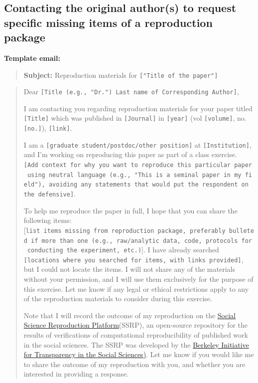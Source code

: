 \documentclass[
]{book}
\begin{document}
\hypertarget{contacting-the-original-authors-to-request-specific-missing-items-of-a-reproduction-package}{%
\subsection{Contacting the original author(s) to request specific missing items of a reproduction package}\label{contacting-the-original-authors-to-request-specific-missing-items-of-a-reproduction-package}}

\textbf{Template email:}

\begin{quote}
\textbf{Subject:} Reproduction materials for \texttt{{[}"Title\ of\ the\ paper"{]}}
\end{quote}

\begin{quote}
Dear \texttt{{[}Title\ (e.g.,\ "Dr.")\ Last\ name\ of\ Corresponding\ Author{]}},

I am contacting you regarding reproduction materials for your paper titled \texttt{{[}Title{]}} which was published in \texttt{{[}Journal{]}} in \texttt{{[}year{]}} (vol \texttt{{[}volume{]}}, no. \texttt{{[}no.{]}}), \texttt{{[}link{]}}.

I am a \texttt{{[}graduate\ student/postdoc/other\ position{]}} at \texttt{{[}Institution{]}}, and I'm working on reproducing this paper as part of a class exercise. \texttt{{[}Add\ context\ for\ why\ you\ want\ to\ reproduce\ this\ particular\ paper\ using\ neutral\ language\ (e.g.,\ "This\ is\ a\ seminal\ paper\ in\ my\ field"),\ avoiding\ any\ statements\ that\ would\ put\ the\ respondent\ on\ the\ defensive{]}}.

To help me reproduce the paper in full, I hope that you can share the following items: {[}\texttt{list\ items\ missing\ from\ reproduction\ package,\ preferably\ bulleted\ if\ more\ than\ one\ (e.g.,\ raw/analytic\ data,\ code,\ protocols\ for\ conducting\ the\ experiment,\ etc.)}{]}. I have already searched \texttt{{[}locations\ where\ you\ searched\ for\ items,\ with\ links\ provided{]}}, but I could not locate the items. I will not share any of the materials without your permission, and I will use them exclusively for the purpose of this exercise. Let me know if any legal or ethical restrictions apply to any of the reproduction materials to consider during this exercise.

Note that I will record the outcome of my reproduction on the \href{https://www.socialsciencereproduction.org/}{Social Science Reproduction Platform}(SSRP), an open-source repository for the results of verifications of computational reproducibility of published work in the social sciences. The SSRP was developed by the \href{https://www.bitss.org/}{Berkeley Initiative for Transparency in the Social Sciences)}. Let me know if you would like me to share the outcome of my reproduction with you, and whether you are interested in providing a response.


\end{quote}
\end{document}
